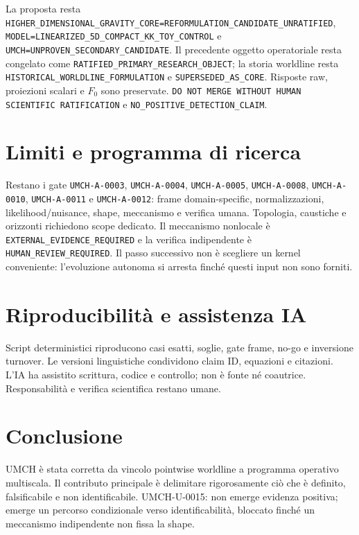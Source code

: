 \documentclass[11pt,a4paper]{article}
\begin{document}
La proposta resta \verb|HIGHER_DIMENSIONAL_GRAVITY_CORE=REFORMULATION_CANDIDATE_UNRATIFIED|, \verb|MODEL=LINEARIZED_5D_COMPACT_KK_TOY_CONTROL| e \verb|UMCH=UNPROVEN_SECONDARY_CANDIDATE|. Il precedente oggetto operatoriale resta congelato come \verb|RATIFIED_PRIMARY_RESEARCH_OBJECT|; la storia worldline resta \verb|HISTORICAL_WORLDLINE_FORMULATION| e \verb|SUPERSEDED_AS_CORE|. Risposte raw, proiezioni scalari e $F_0$ sono preservate. \verb|DO NOT MERGE WITHOUT HUMAN SCIENTIFIC RATIFICATION| e \verb|NO_POSITIVE_DETECTION_CLAIM|.

\section{Limiti e programma di ricerca}\label{sec:u-limits}
Restano i gate \verb|UMCH-A-0003|, \verb|UMCH-A-0004|, \verb|UMCH-A-0005|, \verb|UMCH-A-0008|, \verb|UMCH-A-0010|, \verb|UMCH-A-0011| e \verb|UMCH-A-0012|: frame domain-specific, normalizzazioni, likelihood/nuisance, shape, meccanismo e verifica umana. Topologia, caustiche e orizzonti richiedono scope dedicato. Il meccanismo nonlocale è \verb|EXTERNAL_EVIDENCE_REQUIRED| e la verifica indipendente è \verb|HUMAN_REVIEW_REQUIRED|. Il passo successivo non è scegliere un kernel conveniente: l'evoluzione autonoma si arresta finché questi input non sono forniti.

\section{Riproducibilità e assistenza IA}\label{sec:u-reproducibility}
Script deterministici riproducono casi esatti, soglie, gate frame, no-go e inversione turnover. Le versioni linguistiche condividono claim ID, equazioni e citazioni. L'IA ha assistito scrittura, codice e controllo; non è fonte né coautrice. Responsabilità e verifica scientifica restano umane.

\section{Conclusione}\label{sec:u-conclusion}
UMCH è stata corretta da vincolo pointwise worldline a programma operativo multiscala. Il contributo principale è delimitare rigorosamente ciò che è definito, falsificabile e non identificabile. UMCH-U-0015: non emerge evidenza positiva; emerge un percorso condizionale verso identificabilità, bloccato finché un meccanismo indipendente non fissa la shape.


\end{document}
